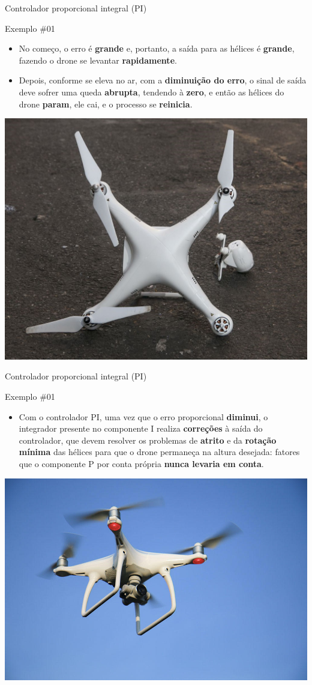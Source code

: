\begin{frame}{Controlador proporcional integral (PI)}
	\begin{block}{Exemplo \#01}
		\begin{itemize}
			\item No começo, o erro é \textbf{grande} e, portanto, a saída para as hélices é \textbf{grande}, fazendo o drone se levantar \textbf{rapidamente}.
			\item Depois, conforme se eleva no ar, com a \textbf{diminuição do erro}, o sinal de saída deve sofrer uma queda \textbf{abrupta}, tendendo à \textbf{zero}, e então as hélices do drone \textbf{param}, ele cai, e o processo se \textbf{reinicia}.
		\end{itemize}
	\end{block}
	
	\centering
	\includegraphics[width=0.4\linewidth]{Figuras/Ch12/fig4n4}
\end{frame}


\begin{frame}{Controlador proporcional integral (PI)}
	\begin{block}{Exemplo \#01}
		\begin{itemize}
			\item Com o controlador PI, uma vez que o erro proporcional \textbf{diminui}, o integrador presente no componente I realiza \textbf{correções} à saída do controlador, que devem resolver os problemas de \textbf{atrito} e da \textbf{rotação mínima} das hélices para que o drone permaneça na altura desejada: fatores que o componente P por conta própria \textbf{nunca levaria em conta}.
		\end{itemize}
	\end{block}

	\smallskip
	
	\centering
	\includegraphics[width=0.5\linewidth]{Figuras/Ch12/fig4n5}
\end{frame}


